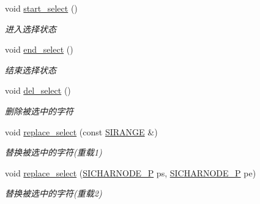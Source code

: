 \begin{DoxyCompactItemize}
\begin{DoxyCompactList}
\end{DoxyCompactList}\item 
\mbox{\label{class_s_i_t_e_x_t_a64816d0a3be43c67522eb09cd6b4eb94}} 
void \hyperlink{class_s_i_t_e_x_t_a64816d0a3be43c67522eb09cd6b4eb94}{start\+\_\+select} ()
\begin{DoxyCompactList}\small\item\em 进入选择状态 \end{DoxyCompactList}\item 
\mbox{\label{class_s_i_t_e_x_t_ab33035ffd92c0d5859c61c37f26de48c}} 
void \hyperlink{class_s_i_t_e_x_t_ab33035ffd92c0d5859c61c37f26de48c}{end\+\_\+select} ()
\begin{DoxyCompactList}\small\item\em 结束选择状态 \end{DoxyCompactList}\item 
\mbox{\label{class_s_i_t_e_x_t_a4b703f105335a08b6080cb8b233ea6c0}} 
void \hyperlink{class_s_i_t_e_x_t_a4b703f105335a08b6080cb8b233ea6c0}{del\+\_\+select} ()
\begin{DoxyCompactList}\small\item\em 删除被选中的字符 \end{DoxyCompactList}\item 
\mbox{\label{class_s_i_t_e_x_t_a5919f6a8ad7413503660035259a84fbe}} 
void \hyperlink{class_s_i_t_e_x_t_a5919f6a8ad7413503660035259a84fbe}{replace\+\_\+select} (const \hyperlink{struct_s_i_r_a_n_g_e}{S\+I\+R\+A\+N\+GE} \&)
\begin{DoxyCompactList}\small\item\em 替换被选中的字符(重载1) \end{DoxyCompactList}\item 
\mbox{\label{class_s_i_t_e_x_t_ac2480043349d0c611a717c87ffbc6415}} 
void \hyperlink{class_s_i_t_e_x_t_ac2480043349d0c611a717c87ffbc6415}{replace\+\_\+select} (\hyperlink{class_s_i_c_h_a_r_n_o_d_e}{S\+I\+C\+H\+A\+R\+N\+O\+D\+E\+\_\+P} ps, \hyperlink{class_s_i_c_h_a_r_n_o_d_e}{S\+I\+C\+H\+A\+R\+N\+O\+D\+E\+\_\+P} pe)
\begin{DoxyCompactList}\small\item\em 替换被选中的字符(重载2) \end{DoxyCompactList}\item 

\end{DoxyCompactItemize}
